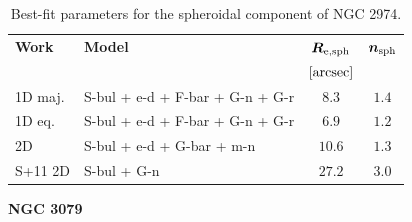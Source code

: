 \documentclass[preprint2]{emulateapj}
\begin{document}
  \begin{table}[h]
  \small
  \caption{Best-fit parameters for the spheroidal component of NGC 2974.}
  \begin{center}
  \begin{tabular}{llcc}
  \hline
  {\bf Work} & {\bf Model}   & $\bm R_{\rm e,sph}$    & $\bm n_{\rm sph}$ \\
    &  &  $[\rm arcsec]$ & \\
  \hline
  1D maj. & S-bul + e-d + F-bar + G-n + G-r & $8.3$   &  $1.4$ \\
  1D eq.  & S-bul + e-d + F-bar + G-n + G-r & $6.9$   &  $1.2$ \\
  2D      & S-bul + e-d + G-bar + m-n	 & $10.6$  &  $1.3$ \\
  \hline
  S+11 2D         & S-bul + G-n & $27.2$  &  $3.0$ \\
  \hline
  \end{tabular}
  \end{center}
  \label{tab:n2974}
  \end{table}

  \clearpage\newpage\noindent
    
  {\bf NGC 3079 \\}
\end{document}
